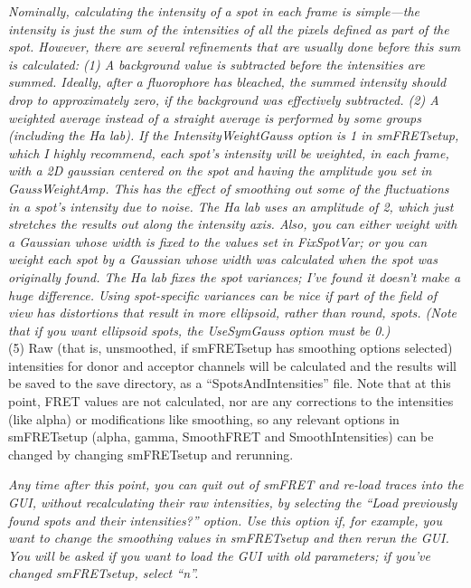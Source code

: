 \documentclass[11pt]{article}
\begin{document}
{\it Nominally, calculating the intensity of a spot in each frame is simple---the intensity is just the sum of the intensities of all the pixels defined as part of the spot. However, there are several refinements that are usually done before this sum is calculated: (1) A background value is subtracted before the intensities are summed.  Ideally, after a fluorophore has bleached, the summed intensity should drop to approximately zero, if the background was effectively subtracted. (2) A weighted average instead of a straight average is performed by some groups (including the Ha lab). If the IntensityWeightGauss option is 1 in smFRETsetup, which I highly recommend, each spot's intensity will be weighted, in each frame, with a 2D gaussian centered on the spot and having the amplitude you set in GaussWeightAmp. This has the effect of smoothing out some of the fluctuations in a spot's intensity due to noise. The Ha lab uses an amplitude of 2, which just stretches the results out along the intensity axis.  Also, you can either weight with a Gaussian whose width is fixed to the values set in FixSpotVar; or you can weight each spot by a Gaussian whose width was calculated when the spot was originally found. The Ha lab fixes the spot variances; I've found it doesn't make a huge difference. Using spot-specific variances can be nice if part of the field of view has distortions that result in more ellipsoid, rather than round, spots.  (Note that if you want ellipsoid spots, the UseSymGauss option must be 0.)}\\

\noindent (5) Raw (that is, unsmoothed, if smFRETsetup has smoothing options selected) intensities for donor and acceptor channels will be calculated and the results will be saved to the save directory, as a ``SpotsAndIntensities'' file.  Note that at this point, FRET values are not calculated, nor are any corrections to the intensities (like alpha) or modifications like smoothing, so any relevant options in smFRETsetup (alpha, gamma, SmoothFRET and SmoothIntensities) can be changed by changing smFRETsetup and rerunning.

{\it Any time after this point, you can quit out of smFRET and re-load traces into the GUI, without recalculating their raw intensities, by selecting the ``Load previously found spots and their intensities?'' option.  Use this option if, for example, you want to change the smoothing values in smFRETsetup and then rerun the GUI.  You will be asked if you want to load the GUI with old parameters; if you've changed smFRETsetup, select ``n''.}
\end{document}
